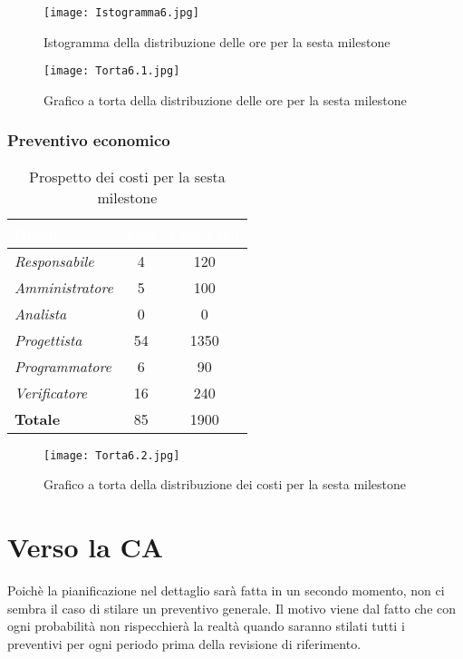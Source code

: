 \begin{figure}[H]
    \texttt{[image: Istogramma6.jpg]}
    \caption{Istogramma della distribuzione delle ore per la sesta milestone}
\end{figure}

\begin{figure}[H]
    \texttt{[image: Torta6.1.jpg]}
    \caption{Grafico a torta della distribuzione delle ore per la sesta milestone}
\end{figure}

\newpage
\subsubsection{Preventivo economico}

\begin{table}[H]
    \renewcommand\arraystretch{1.5}
    \centering
    \begin{tabular}{|l|c|c|}
    \hline
    \rowcolor[HTML]{036400}
    \textcolor{white}{\textbf{Ruolo}} & \multicolumn{1}{l|}{\textcolor{white}{\textbf{Ore}}} & \multicolumn{1}{l|}{\textcolor{white}{\textbf{Costo (€)}}} \\ \hline
    \rowcolor[HTML]{EFEFEF}\textit{Responsabile}   & 4    & 120     \\ \hline
    \rowcolor[HTML]{C0C0C0}\textit{Amministratore} & 5  & 100     \\ \hline
    \rowcolor[HTML]{EFEFEF}\textit{Analista}       & 0    & 0     \\ \hline
    \rowcolor[HTML]{C0C0C0}\textit{Progettista}    & 54 & 1350  \\ \hline
    \rowcolor[HTML]{EFEFEF}\textit{Programmatore}  & 6 & 90  \\ \hline
    \rowcolor[HTML]{C0C0C0}\textit{Verificatore}   & 16 & 240  \\ \hline
    \rowcolor[HTML]{EFEFEF}\textbf{Totale}         & 85   & 1900  \\ \hline
    \end{tabular}
    \caption{Prospetto dei costi per la sesta milestone}
\end{table}

\begin{figure}[H]
    \texttt{[image: Torta6.2.jpg]}
    \caption{Grafico a torta della distribuzione dei costi per la sesta milestone}
\end{figure}

\newpage
\section{Verso la CA}

Poichè la pianificazione nel dettaglio sarà fatta in un secondo momento, non ci sembra il caso di stilare un preventivo generale. Il motivo viene dal fatto che con ogni probabilità non rispecchierà la realtà quando saranno stilati tutti i preventivi per ogni periodo prima della revisione di riferimento.
